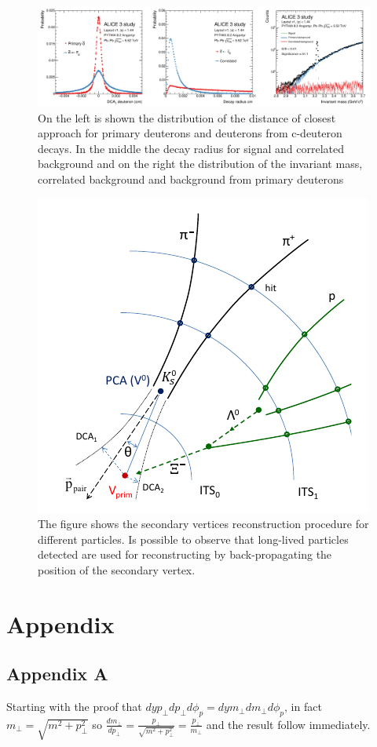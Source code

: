 \documentclass[12pt,a4paper]{book}
\begin{document}
	\begin{figure}
	\centering
	\includegraphics[width=1 \linewidth]{pictures/ALICE_c-d_detection.png}
	\caption{On the left is shown the distribution of the distance of closest approach for primary deuterons and deuterons	from c-deuteron decays. In the middle the decay radius for signal and correlated background and on the right the distribution of the invariant mass, correlated background and background from primary deuterons}
	\label{fig:ALICE_c-d_detection}
\end{figure}

	\begin{figure}
	\centering
		\includegraphics[width=0.5 \linewidth]{pictures/secondary_vertex.png}
		\caption{The figure shows the secondary vertices reconstruction procedure for different particles. Is possible to observe that long-lived particles detected are used for reconstructing by back-propagating the position of the secondary vertex.}
		\label{fig:secondary_vertex}
\end{figure}


	
	\chapter{Appendix}
	\appendix
	\renewcommand{\thesection}{\Alph{section}}
	\section{Appendix A} \label{app:A}
	Starting with the proof that $dy p_\perp dp_\perp d\phi_p = dy m_\perp dm_\perp d\phi_p$, in fact $m_\perp=\sqrt{m^2 + p_\perp^2}$ so $\frac{dm_\perp}{dp_\perp}= \frac{p_\perp}{\sqrt{m^2 + p_\perp^2}} = \frac{p_\perp}{m_\perp}$ and the result follow immediately.
	
\end{document}
